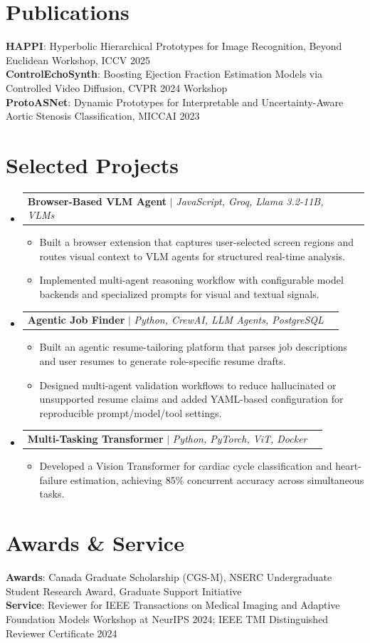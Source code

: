 \documentclass[letterpaper,11pt]{article}
\makeatletter
\newcommand{\resumeItem}[1]{
  \item\small{{#1} \vspace{-2pt}}
}
\newcommand{\resumeProjectHeading}[2]{
    \item
    \begin{tabular*}{0.97\textwidth}{l@{\extracolsep{\fill}}r}
      \small#1 & #2 \\
    \end{tabular*}\vspace{-7pt}
}
\newcommand{\resumeSubHeadingListStart}{\begin{itemize}[leftmargin=0.15in, label={}]}
\newcommand{\resumeSubHeadingListEnd}{\end{itemize}}
\newcommand{\resumeItemListStart}{\begin{itemize}[leftmargin=0.2in]}
\newcommand{\resumeItemListEnd}{\end{itemize}\vspace{-5pt}}
\makeatother
\begin{document}
\section{Publications}
 \begin{itemize}[leftmargin=0.15in, label={}]
    \small{\item{
     \textbf{HAPPI}: Hyperbolic Hierarchical Prototypes for Image Recognition, Beyond Euclidean Workshop, ICCV 2025 \\
     \textbf{ControlEchoSynth}: Boosting Ejection Fraction Estimation Models via Controlled Video Diffusion, CVPR 2024 Workshop \\
     \textbf{ProtoASNet}: Dynamic Prototypes for Interpretable and Uncertainty-Aware Aortic Stenosis Classification, MICCAI 2023
    }}
 \end{itemize}

\section{Selected Projects}
    \resumeSubHeadingListStart
      \resumeProjectHeading
          {\textbf{Browser-Based VLM Agent} $|$ \emph{JavaScript, Groq, Llama 3.2-11B, VLMs}}{}
          \resumeItemListStart
            \resumeItem{Built a browser extension that captures user-selected screen regions and routes visual context to VLM agents for structured real-time analysis.}
            \resumeItem{Implemented multi-agent reasoning workflow with configurable model backends and specialized prompts for visual and textual signals.}
          \resumeItemListEnd
      \resumeProjectHeading
          {\textbf{Agentic Job Finder} $|$ \emph{Python, CrewAI, LLM Agents, PostgreSQL}}{}
          \resumeItemListStart
            \resumeItem{Built an agentic resume-tailoring platform that parses job descriptions and user resumes to generate role-specific resume drafts.}
            \resumeItem{Designed multi-agent validation workflows to reduce hallucinated or unsupported resume claims and added YAML-based configuration for reproducible prompt/model/tool settings.}
          \resumeItemListEnd
      \resumeProjectHeading
          {\textbf{Multi-Tasking Transformer} $|$ \emph{Python, PyTorch, ViT, Docker}}{}
          \resumeItemListStart
            \resumeItem{Developed a Vision Transformer for cardiac cycle classification and heart-failure estimation, achieving 85\% concurrent accuracy across simultaneous tasks.}
          \resumeItemListEnd
    \resumeSubHeadingListEnd

\section{Awards \& Service}
 \begin{itemize}[leftmargin=0.15in, label={}]
    \small{\item{
     \textbf{Awards}{: Canada Graduate Scholarship (CGS-M), NSERC Undergraduate Student Research Award, Graduate Support Initiative} \\
     \textbf{Service}{: Reviewer for IEEE Transactions on Medical Imaging and Adaptive Foundation Models Workshop at NeurIPS 2024; IEEE TMI Distinguished Reviewer Certificate 2024}
    }}
 \end{itemize}
\end{document}

